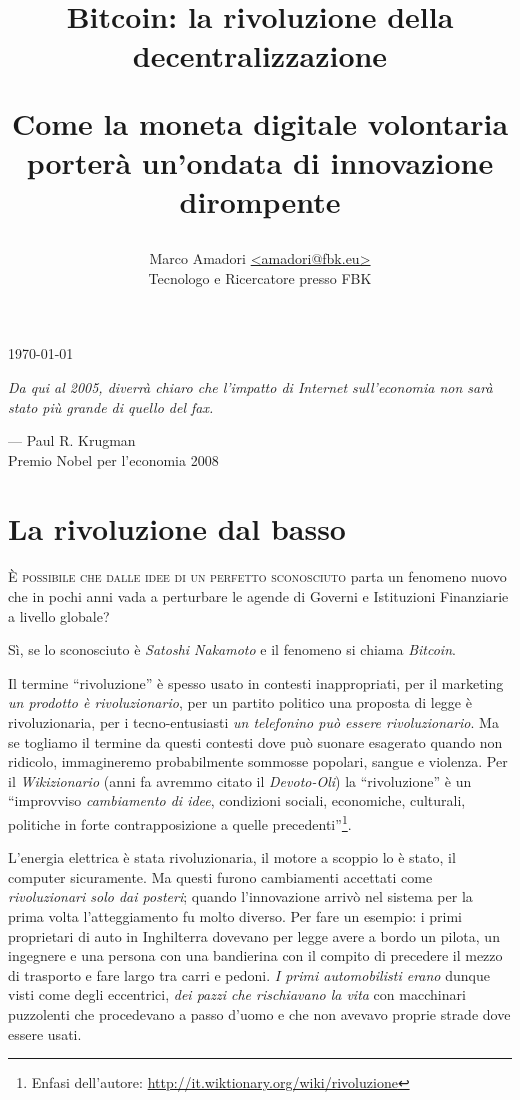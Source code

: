 \documentclass[a4paper,12pt,italian]{article}
\title{\textbf{Bitcoin: la rivoluzione della decentralizzazione} \\ 
  \bigskip
  \begin{Large}Come la moneta digitale volontaria 
  porterà un’ondata di innovazione dirompente
  \end{Large}
}
\date{\vspace{-5ex}}
\author{\vspace{-5ex}}
\author{\begin{small}Marco Amadori \href{mailto:amadori.fbk.eu}{<amadori@fbk.eu>} \\ 
Tecnologo e Ricercatore presso FBK
\end{small}}
\makeatletter
\renewcommand\maketitle{
\newpage\thispagestyle{empty}
    \begin{center}
        {\huge\@title\par}
        \bigskip
        {\ttfamily \today{}\par}
    \end{center}
}
\makeatother
\begin{document}
\maketitle

\epigraph{\textit{Da qui al 2005, diverrà chiaro che l’impatto di Internet sull’economia
non sarà stato più grande di quello del fax.}\footnotemark}{ --- Paul R. Krugman \\ 
Premio Nobel per l’economia 2008}


\section*{La rivoluzione dal basso}

\lettrine{È}{ possibile che dalle idee di un perfetto sconosciuto} parta un fenomeno
nuovo che in pochi anni vada a perturbare le agende di Governi e
Istituzioni Finanziarie a livello globale?

\bigskip

Sì, se lo sconosciuto è \emph{Satoshi Nakamoto} e il fenomeno si chiama
\emph{Bitcoin}.

\bigskip

Il termine “rivoluzione” è spesso usato in contesti inappropriati, per
il marketing \emph{un prodotto è rivoluzionario}, per un partito politico una
proposta di legge è rivoluzionaria, per i tecno-entusiasti \emph{un
telefonino può essere rivoluzionario}. Ma se togliamo il termine da
questi contesti dove può suonare esagerato quando non ridicolo,
immagineremo probabilmente sommosse popolari, sangue e violenza. Per il
\emph{Wikizionario} (anni fa avremmo citato il \emph{Devoto-Oli}) la “rivoluzione” è
un “improvviso \emph{cambiamento di idee}, condizioni sociali, economiche,
culturali, politiche in forte contrapposizione a quelle
precedenti”\footnote{Enfasi dell'autore: \url{http://it.wiktionary.org/wiki/rivoluzione}}.

\bigskip

L’energia elettrica è stata rivoluzionaria, il motore a scoppio lo è
stato, il computer sicuramente. Ma questi furono cambiamenti accettati
come \emph{rivoluzionari solo dai posteri}; quando l’innovazione arrivò nel
sistema per la prima volta l’atteggiamento fu molto diverso. Per fare
un esempio: i primi proprietari di auto in Inghilterra dovevano per
legge avere a bordo un pilota, un ingegnere e una persona con una
bandierina con il compito di precedere il mezzo di trasporto e fare largo tra
carri e pedoni. \emph{I primi automobilisti erano} dunque visti come degli
eccentrici, \emph{dei pazzi che rischiavano la vita} con macchinari puzzolenti
che procedevano a passo d’uomo e che non avevavo proprie strade dove
essere usati.
\end{document}
